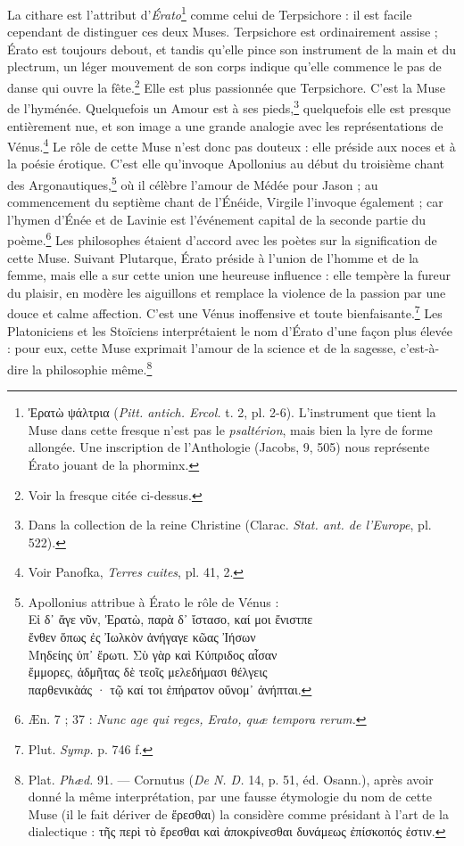 \documentclass[landscape, a4paper, 11pt, oneside, polutonikogreek, french]{article}
\begin{document}
La cithare est l'attribut d'\emph{Érato}\footnote{Ἐρατὼ ψάλτρια (\emph{Pitt. antich. Ercol.} t. 2, pl. 2-6). L'instrument que tient la Muse dans cette fresque n'est pas le \emph{psaltérion}, mais bien la lyre de forme allongée. Une inscription de l'Anthologie (Jacobs, 9, 505) nous représente Érato jouant de la phorminx.} comme celui de Terpsichore : il est facile cependant de distinguer ces deux Muses. Terpsichore est ordinairement assise ; Érato est toujours debout, et tandis qu'elle pince son instrument de la main et du plectrum, un léger mouvement de son corps indique qu'elle commence le pas de danse qui ouvre la fête.\footnote{Voir la fresque citée ci-dessus.} Elle est plus passionnée que Terpsichore. C'est la Muse de l'hyménée. Quelquefois un Amour est à ses pieds,\footnote{Dans la collection de la reine Christine (Clarac. \emph{Stat. ant. de l'Europe}, pl. 522).} quelquefois elle est presque entièrement nue, et son image a une grande analogie avec les représentations de Vénus.\footnote{Voir Panofka, \emph{Terres cuites}, pl. 41, 2.} Le rôle de cette Muse n'est donc pas douteux : elle préside aux noces et à la poésie érotique. C'est elle qu'invoque Apollonius au début du troisième chant des Argonautiques,\footnote{Apollonius attribue à Érato le rôle de Vénus :\\\hspace*{5mm}Εἰ δ᾽ ἄγε νῦν, Ἐρατὼ, παρὰ δ᾽ ἴστασο, καί μοι ἔνιστπε\\\hspace*{5mm}ἔνθεν ὅπως ἐς Ἰωλκὸν ἀνήγαγε κῶας Ἰήσων\\\hspace*{5mm}Μηδείης ὑπ᾽ ἔρωτι. Σὺ γὰρ καὶ Κύπριδος αἶσαν\\\hspace*{5mm}ἔμμορες, ἀδμῆτας δὲ τεοῖς μελεδήμασι θέλγεις\\\hspace*{5mm}παρθενικὰάς · τῷ καί τοι ἐπήρατον οὔνομ᾽ ἀνήπται.} où il célèbre l'amour de Médée pour Jason ; au commencement du septième chant de l'Énéide, Virgile l'invoque également ; car l'hymen d'Énée et de Lavinie est l'événement capital de la seconde partie du poème.\footnote{Æn. 7 ; 37 : \emph{Nunc age qui reges, Erato, quæ tempora rerum.}} Les philosophes étaient d'accord avec les poètes sur la signification de cette Muse. Suivant Plutarque, Érato préside à l'union de l'homme et de la femme, mais elle a sur cette union une heureuse influence : elle tempère la fureur du plaisir, en modère les aiguillons et remplace la violence de la passion par une douce et calme affection. C'est une Vénus inoffensive et toute bienfaisante.\footnote{Plut. \emph{Symp.} p. 746 f.} Les Platoniciens et les Stoïciens interprétaient le nom d'Érato d'une façon plus élevée : pour eux, cette Muse exprimait l'amour de la science et de la sagesse, c'est-à-dire la philosophie même.\footnote{Plat. \emph{Phæd.} 91. --- Cornutus (\emph{De N. D.} 14, p. 51, éd. Osann.), après avoir donné la même interprétation, par une fausse étymologie du nom de cette Muse (il le fait dériver de ἔρεσθαι) la considère comme présidant à l'art de la dialectique : τῆς περὶ τὸ ἔρεσθαι καὶ ἀποκρίνεσθαι δυνάμεως ἐπίσκοπός ἐστιν.}
\end{document}
